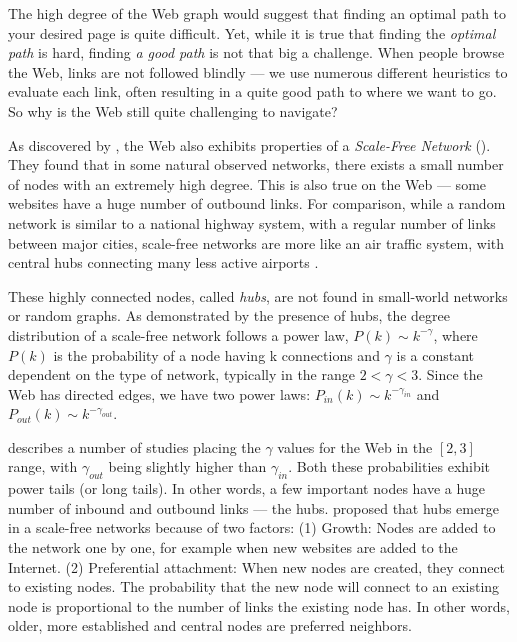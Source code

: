 The high degree of the Web graph would suggest that finding an optimal path to your desired page is quite difficult. 
Yet, while it is true that finding the \emph{optimal path} is hard, finding \emph{a good path} is not that big a challenge. 
When people browse the Web, links are not followed blindly --- we use numerous different heuristics to evaluate each link, often resulting in a quite good path to where we want to go. 
So why is the Web still quite challenging to navigate?

As discovered by \cite{Albert1999}, the Web also exhibits properties of a \emph{Scale-Free Network} (). 
They found that in some natural observed networks, there exists a small number of nodes with an extremely high degree. 
This is also true on the Web --- some websites have a huge number of outbound links. 
For comparison, while a random network is similar to a national highway system, with a regular number of links between major cities, scale-free networks are more like an air traffic system, with central hubs connecting many less active airports \citep[p71]{Barabasi2003}.

These highly connected nodes, called \emph{hubs}, are not found in small-world networks or random graphs. As demonstrated by the presence of hubs, the degree distribution of a scale-free network follows a power law, 
$P(k) \sim k^{-\gamma}$, 
where $P(k)$ is the probability of a node having k connections and $\gamma$ is a constant dependent on the type of network, typically in the range $2 < \gamma < 3$. 
Since the Web has directed edges,
we have two power laws:
$P_{in}(k) \sim k^{-\gamma_{in}}$ and 
$P_{out}(k) \sim k^{-\gamma_{out}}$.

\cite{Albert1999} describes a number of studies placing the $\gamma$ values for the Web in the $[2,3]$ range, 
with $\gamma_{out}$ being slightly higher than $\gamma_{in}$. 
Both these probabilities exhibit power tails (or long tails). 
In other words, a few important nodes have a huge number of inbound and outbound links --- the hubs. 
\citet[p86]{Barabasi2003} proposed that hubs emerge in a scale-free networks because of two factors:
(1) Growth: Nodes are added to the network one by one, for example when new websites are added to the Internet.
(2) Preferential attachment: When new nodes are created, they connect to existing nodes. The probability that the new node will connect to an existing node is proportional to the number of links the existing node has. In other words, older, more established and central nodes are preferred neighbors.

